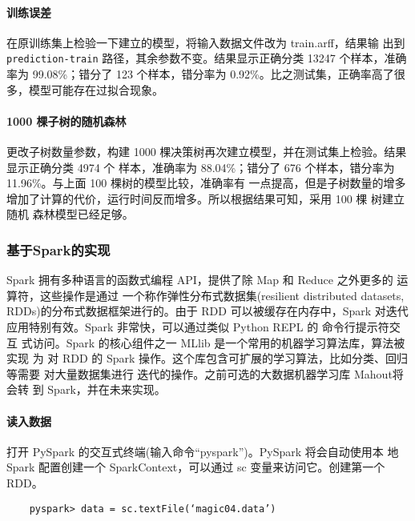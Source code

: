 \paragraph{训练误差}\label{ux8badux7ec3ux8befux5dee}

在原训练集上检验一下建立的模型，将输入数据文件改为 train.arff，结果输 出到
\texttt{prediction-train} 路径，其余参数不变。结果显示正确分类 13247
个样本，准确率为 99.08\%；错分了 123 个样本，错分率为
0.92\%。比之测试集，正确率高了很多，模型可能存在过拟合现象。

\paragraph{1000
棵子树的随机森林}\label{ux68f5ux5b50ux6811ux7684ux968fux673aux68eeux6797}

更改子树数量参数，构建 1000
棵决策树再次建立模型，并在测试集上检验。结果显示正确分类 4974 个
样本，准确率为 88.04\%；错分了 676 个样本，错分率为11.96\%。与上面 100
棵树的模型比较，准确率有
一点提高，但是子树数量的增多增加了计算的代价，运行时间反而增多。所以根据结果可知，采用
100 棵 树建立随机 森林模型已经足够。

\subsubsection{基于Spark的实现}\label{ux57faux4e8esparkux7684ux5b9eux73b0}

Spark 拥有多种语言的函数式编程 API，提供了除 Map 和 Reduce 之外更多的
运算符，这些操作是通过 一个称作弹性分布式数据集(resilient distributed
datasets, RDDs)的分布式数据框架进行的。由于 RDD 可以被缓存在内存中，Spark
对迭代 应用特别有效。Spark 非常快，可以通过类似 Python REPL 的
命令行提示符交互 式访问。Spark 的核心组件之一 MLlib
是一个常用的机器学习算法库，算法被实现 为 对 RDD 的 Spark
操作。这个库包含可扩展的学习算法，比如分类、回归等需要 对大量数据集进行
迭代的操作。之前可选的大数据机器学习库 Mahout将会转 到
Spark，并在未来实现。

\paragraph{读入数据}\label{ux8bfbux5165ux6570ux636e}

打开 PySpark 的交互式终端(输入命令``pyspark'')。PySpark 将会自动使用本
地 Spark 配置创建一个 SparkContext，可以通过 sc 变量来访问它。创建第一个
RDD。

\begin{lstlisting}
	pyspark> data = sc.textFile(‘magic04.data’)
\end{lstlisting}

